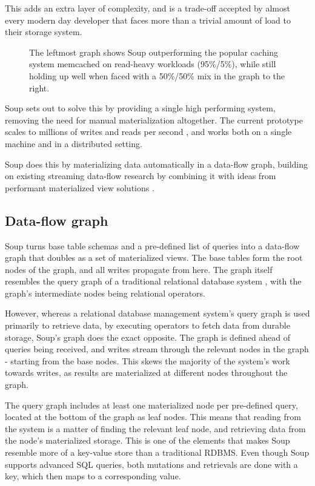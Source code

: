 \documentclass[b5paper]{report}
\begin{document}
This adds an extra layer of complexity, and is a trade-off accepted by almost
every modern day developer that faces more than a trivial amount of load to
their storage system.

\begin{figure}[H]
  \centering
  
  \caption{
    The leftmost graph shows Soup outperforming the popular caching system
    memcached on read-heavy workloads (95\%/5\%), while still holding up well
    when faced with a 50\%/50\% mix in the graph to the right.
  }
\end{figure}

Soup sets out to solve this by providing a single high performing system,
removing the need for manual materialization altogether. The current prototype
scales to millions of writes and reads per second \cite{soup}, and works both on
a single machine and in a distributed setting.

Soup does this by materializing data automatically in a data-flow
graph, building on existing streaming data-flow research \cite{naiad, dataflow}
by combining it with ideas from performant materialized view solutions
\cite{dbtoaster, pequod}.

\subsection{Data-flow graph}
Soup turns base table schemas and a pre-defined list of queries into a data-flow
graph that doubles as a set of materialized views. The base tables form the
root nodes of the graph, and all writes propagate from here. The graph itself
resembles the query graph of a traditional relational database system
\cite{codd}, with the graph's intermediate nodes being relational operators.

However, whereas a relational database management system's query graph is used
primarily to retrieve data, by executing operators to fetch data from durable
storage, Soup's graph does the exact opposite. The graph is defined ahead of
queries being received, and writes stream through the relevant nodes in the
graph - starting from the base nodes. This skews the majority of the system's
work towards writes, as results are materialized at different nodes throughout
the graph.

The query graph includes at least one materialized node per pre-defined query,
located at the bottom of the graph as leaf nodes. This means that reading from
the system is a matter of finding the relevant leaf node, and retrieving data
from the node's materialized storage. This is one of the elements that makes Soup
resemble more of a key-value store than a traditional RDBMS. Even though Soup
supports advanced SQL queries, both mutations and retrievals are done with a
key, which then maps to a corresponding value.
\end{document}
